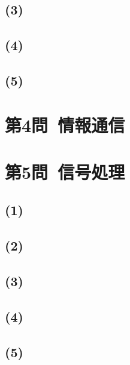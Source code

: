 \documentclass[a4paper,12pt,xelatex,ja=standard]{bxjsarticle}
\begin{document}
\subsection*{(3)}

\subsection*{(4)}

\subsection*{(5)}

\section*{第4問\ 情報通信}

\section*{第5問\ 信号処理}
\subsection*{(1)}

\subsection*{(2)}

\subsection*{(3)}

\subsection*{(4)}

\subsection*{(5)}
\end{document}
